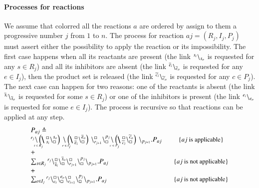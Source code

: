 \paragraph{Processes for reactions}
We assume that {color{red} all the reactions $a$ are ordered by assign to them a progressive  number $j$
from $1$ to $n$.}
The process for reaction $aj=(R_j,I_j,P_j)$ must assert either the possibility to apply the reaction or its impossibility.
The first case happens when all its reactants are present (the link ${}^{s_i} \backslash_{s_o}$ is requested for any $s\in R_j$) and all its inhibitors are absent (the link ${}^{\overline{e}_i} \backslash_{\overline{e}_o}$ is requested for any $e\in I_j$), then the product set is released (the link ${}^{\widetilde{c}_i} \backslash_{\widetilde{c}_o}$ is requested for any $c\in P_j$).
The next case can happen for two reasons: one of the reactants is absent (the link ${}^{\overline{s}_i} \backslash_{\overline{s}_o}$ is requested for some $s\in R_j$) or one of the inhibitors is present (the link ${}^{e_i} \backslash_{e_o}$ is requested for some $e\in I_j$).
The process is recursive so that reactions can be applied at any step.
\[
\begin{array}{lcl@{\quad}l}
P_{aj} \defeq \\ 
 ^{r_j} \backslash  \blockchain{s_i}{s_o}{s \in R_j} \link{}{} \blockchain{\overline{e}_i}{\overline{e}_o}{e \in I_j} \chainedlink{r_{j+1}}{\noact}\chainedlink{\noact}{p_j}\link{}{} \blockchain{\widetilde{c}_i}{\widetilde{c}_o}{c \in P_j} \backslash_{p_{j+1}}.P_{aj} & \mbox{\small  \{$aj$ is applicable\}}\\
 + \ \\
 \sum_{s\in R_j}\startchain{r_j}\chainedlink{\overline{s}_i}{\noact}\chainedlink{\noact}{\overline{s}_o} \chainedlink{r_{j+1}}{\noact}\chainedlink{\noact}{p_{j}}\chainend{p_{j+1}}.P_{aj}  & \mbox{\small  \{$aj$ is not applicable\}}\\
+\\
 \sum_{e\in I_j}\startchain{r_j}\chainedlink{e_i}{\noact} \chainedlink{\noact}{e_o} \chainedlink{r_{i+1}}{\noact}\chainedlink{\noact}{p_{j}}\chainend{p_{j+1}}.P_{aj}  & \mbox{\small \{$aj$ is not applicable\}}\\
\end{array}
\]

